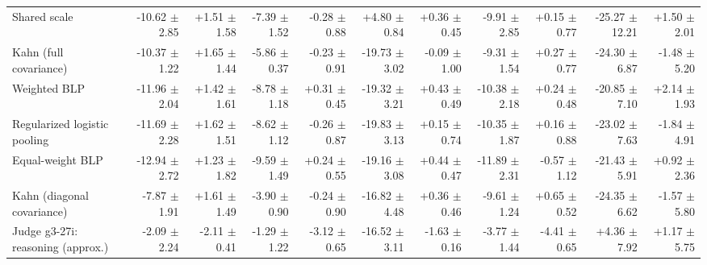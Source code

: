 \begin{tabular}{lrrrrrrrrrr}
Shared scale & -10.62 {\scriptsize $\pm$ 2.85} & +1.51 {\scriptsize $\pm$ 1.58} & -7.39 {\scriptsize $\pm$ 1.52} & -0.28 {\scriptsize $\pm$ 0.88} & +4.80 {\scriptsize $\pm$ 0.84} & +0.36 {\scriptsize $\pm$ 0.45} & -9.91 {\scriptsize $\pm$ 2.85} & +0.15 {\scriptsize $\pm$ 0.77} & -25.27 {\scriptsize $\pm$ 12.21} & +1.50 {\scriptsize $\pm$ 2.01} \\
Kahn (full covariance) & -10.37 {\scriptsize $\pm$ 1.22} & +1.65 {\scriptsize $\pm$ 1.44} & -5.86 {\scriptsize $\pm$ 0.37} & -0.23 {\scriptsize $\pm$ 0.91} & -19.73 {\scriptsize $\pm$ 3.02} & -0.09 {\scriptsize $\pm$ 1.00} & -9.31 {\scriptsize $\pm$ 1.54} & +0.27 {\scriptsize $\pm$ 0.77} & -24.30 {\scriptsize $\pm$ 6.87} & -1.48 {\scriptsize $\pm$ 5.20} \\
Weighted BLP & -11.96 {\scriptsize $\pm$ 2.04} & +1.42 {\scriptsize $\pm$ 1.61} & -8.78 {\scriptsize $\pm$ 1.18} & +0.31 {\scriptsize $\pm$ 0.45} & -19.32 {\scriptsize $\pm$ 3.21} & +0.43 {\scriptsize $\pm$ 0.49} & -10.38 {\scriptsize $\pm$ 2.18} & +0.24 {\scriptsize $\pm$ 0.48} & -20.85 {\scriptsize $\pm$ 7.10} & +2.14 {\scriptsize $\pm$ 1.93} \\
Regularized logistic pooling & -11.69 {\scriptsize $\pm$ 2.28} & +1.62 {\scriptsize $\pm$ 1.51} & -8.62 {\scriptsize $\pm$ 1.12} & -0.26 {\scriptsize $\pm$ 0.87} & -19.83 {\scriptsize $\pm$ 3.13} & +0.15 {\scriptsize $\pm$ 0.74} & -10.35 {\scriptsize $\pm$ 1.87} & +0.16 {\scriptsize $\pm$ 0.88} & -23.02 {\scriptsize $\pm$ 7.63} & -1.84 {\scriptsize $\pm$ 4.91} \\
Equal-weight BLP & -12.94 {\scriptsize $\pm$ 2.72} & +1.23 {\scriptsize $\pm$ 1.82} & -9.59 {\scriptsize $\pm$ 1.49} & +0.24 {\scriptsize $\pm$ 0.55} & -19.16 {\scriptsize $\pm$ 3.08} & +0.44 {\scriptsize $\pm$ 0.47} & -11.89 {\scriptsize $\pm$ 2.31} & -0.57 {\scriptsize $\pm$ 1.12} & -21.43 {\scriptsize $\pm$ 5.91} & +0.92 {\scriptsize $\pm$ 2.36} \\
Kahn (diagonal covariance) & -7.87 {\scriptsize $\pm$ 1.91} & +1.61 {\scriptsize $\pm$ 1.49} & -3.90 {\scriptsize $\pm$ 0.90} & -0.24 {\scriptsize $\pm$ 0.90} & -16.82 {\scriptsize $\pm$ 4.48} & +0.36 {\scriptsize $\pm$ 0.46} & -9.61 {\scriptsize $\pm$ 1.24} & +0.65 {\scriptsize $\pm$ 0.52} & -24.35 {\scriptsize $\pm$ 6.62} & -1.57 {\scriptsize $\pm$ 5.80} \\
Judge g3-27i: reasoning (approx.) & -2.09 {\scriptsize $\pm$ 2.24} & -2.11 {\scriptsize $\pm$ 0.41} & -1.29 {\scriptsize $\pm$ 1.22} & -3.12 {\scriptsize $\pm$ 0.65} & -16.52 {\scriptsize $\pm$ 3.11} & -1.63 {\scriptsize $\pm$ 0.16} & -3.77 {\scriptsize $\pm$ 1.44} & -4.41 {\scriptsize $\pm$ 0.65} & +4.36 {\scriptsize $\pm$ 7.92} & +1.17 {\scriptsize $\pm$ 5.75} \\

\end{tabular}
